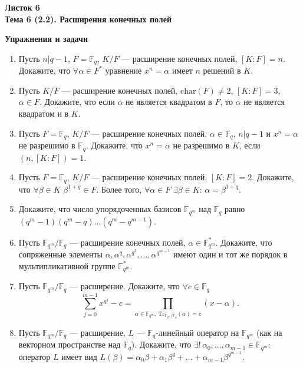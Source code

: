 \documentclass[a4paper, 11pt]{article}
\begin{document}
\begin{center} \Large \bf Листок 6\\ Тема 6 (2.2). Расширения конечных полей \end{center}

\noindent\textbf{Упражнения и задачи}

\begin{enumerate}[topsep=0pt]
    
    \item Пусть $n|q-1$, $F=\mathbb{F}_q$, $K/F$ --- расширение конечных полей, $[K:F] = n$. Докажите, что $\forall \alpha \in F^*$ уравнение $x^n=\alpha$ имеет $n$ решений в $K$. %
    \item Пусть $K/F$ --- расширение конечных полей, $\mathrm{char} (F) \neq 2$, $[K:F] = 3$, $\alpha \in F$. Докажите, что если $\alpha$ не является квадратом в $F$, то $\alpha$ не является квадратом и в $K$. %
    \item Пусть $F=\mathbb{F}_q$, $K/F$ --- расширение конечных полей, $\alpha \in \mathbb{F}_q$, $n|q-1$ и $x^n=\alpha$ не разрешимо в $\mathbb{F}_q$. Докажите, что $x^n=\alpha$ не разрешимо в $K$, если $(n,[K:F])=1$. %
    \item Пусть $F=\mathbb{F}_q$, $K/F$ --- расширение конечных полей, $[K:F] = 2$. Докажите, что $\forall \beta \in K$ $\beta^{1+q} \in F$. Более того, $\forall \alpha \in F$ $\exists \beta \in K$: $\alpha=\beta^{1+q}$. %
    \item Докажите, что число упорядоченных базисов $\mathbb{F}_{q^m}$ над $\mathbb{F}_q$ равно $(q^m-1)(q^m-q)\dots (q^m-q^{m-1})$. %
    \item Пусть $\mathbb{F}_{q^m}/\mathbb{F}_q$ --- расширение конечных полей, $\alpha \in \mathbb{F}_{q^m}^*$. Докажите, что сопряженные элементы $\alpha, \alpha^q, \alpha^{q^2}, \dots, \alpha^{q^{m-1}}$ имеют один и тот же порядок в мультипликативной группе $\mathbb{F}_{q^m}^*$.  %
    \item Пусть $\mathbb{F}_{q^m}/\mathbb{F}_q$ --- расширение. Докажите, что $\forall c\in \mathbb{F}_q$
    $$
        \sum_{j=0}^{m-1} x^{q^j} - c = \prod_{\alpha\in \mathbb{F}_{q^m},\ \mathrm{Tr}_{\mathbb{F}_{q^m}/\mathbb{F}_q}(\alpha)=c} (x-\alpha).
    $$ %
    \item Пусть $\mathbb{F}_{q^m}/\mathbb{F}_q$ --- расширение, $L$ --- $\mathbb{F}_q$-линейный оператор на $\mathbb{F}_{q^m}$ (как на векторном пространстве над $\mathbb{F}_q$). Докажите, что $\exists !\, \alpha_0, \dots, \alpha_{m-1}\in \mathbb{F}_{q^m}$: оператор $L$ имеет вид $L(\beta) = \alpha_0 \beta + \alpha_1 \beta^q + \dots + \alpha_{m-1}\beta^{q^{m-1}}$. %

\end{enumerate}
\end{document}
